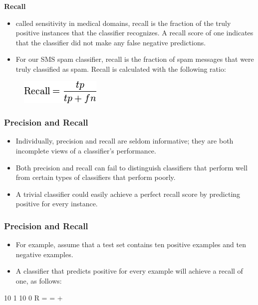 \documentclass[PredictiveAnalytics101.tex]{subfiles}
\begin{document}
\begin{frame}
	\textbf{Recall}
\begin{itemize}
\item  called sensitivity in medical domains, recall is the fraction of the truly
positive instances that the classifier recognizes. A recall score of one indicates
that the classifier did not make any false negative predictions. 

\item For our SMS spam
classifier, recall is the fraction of spam messages that were truly classified as spam.
Recall is calculated with the following ratio:
\end{itemize}

\begin{figure}
\centering
\includegraphics[width=0.7\linewidth]{recall}

\end{figure}

\end{frame}
\begin{frame}
\frametitle{Precision and Recall}
\begin{itemize}
\item Individually, precision and recall are seldom informative; they are both incomplete
views of a classifier's performance. 
\item Both precision and recall can fail to distinguish
classifiers that perform well from certain types of classifiers that perform poorly.
\item A
trivial classifier could easily achieve a perfect recall score by predicting positive for
every instance.
\end{itemize}
 
\end{frame}
\begin{frame}
\frametitle{Precision and Recall}
\begin{itemize}
\item For example, assume that a test set contains ten positive examples
and ten negative examples.
\item A classifier that predicts positive for every example will
achieve a recall of one, as follows:
\end{itemize}

10 1
10 0
R = =
+
\end{frame}
\end{document}
